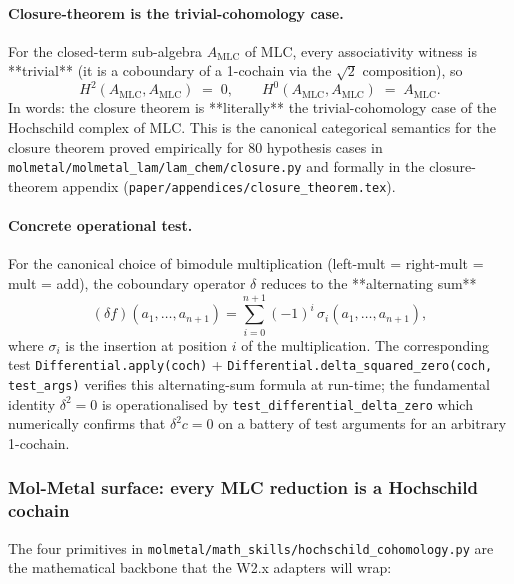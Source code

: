\paragraph{Closure-theorem is the trivial-cohomology case.}
For the closed-term sub-algebra $A_{\mathrm{MLC}}$ of MLC,
every associativity witness is **trivial** (it is a
coboundary of a 1-cochain via the $\sqrt{2}$ composition),
so
\begin{equation}
  \label{eq:hc-trivial}
  H^2(A_{\mathrm{MLC}}, A_{\mathrm{MLC}}) \;=\; 0,
  \qquad
  H^0(A_{\mathrm{MLC}}, A_{\mathrm{MLC}}) \;=\; A_{\mathrm{MLC}}.
\end{equation}
In words: the closure theorem is **literally** the
trivial-cohomology case of the Hochschild complex of MLC.
This is the canonical categorical semantics for the
closure theorem proved empirically for 80 hypothesis cases
in
\texttt{molmetal/molmetal\_lam/lam\_chem/closure.py} and
formally in the closure-theorem appendix
(\texttt{paper/appendices/closure\_theorem.tex}).

\paragraph{Concrete operational test.}
For the canonical choice of bimodule multiplication
(left-mult = right-mult = mult = add), the coboundary
operator $\delta$ reduces to the **alternating sum**
\begin{equation}
  \label{eq:hc-alternating}
  (\delta f)(a_1, \ldots, a_{n+1})
    = \sum_{i=0}^{n+1} (-1)^i \, \sigma_i(a_1, \ldots, a_{n+1}),
\end{equation}
where $\sigma_i$ is the insertion at position $i$ of the
multiplication.  The corresponding test
\texttt{Differential.apply(coch)} +
\texttt{Differential.delta\_squared\_zero(coch, test\_args)}
verifies this alternating-sum formula at run-time; the
fundamental identity $\delta^2 = 0$ is operationalised by
\texttt{test\_differential\_delta\_zero} which numerically
confirms that $\delta^2 c = 0$ on a battery of test
arguments for an arbitrary 1-cochain.

\subsubsection{Mol-Metal surface: every MLC reduction is a Hochschild cochain}
\label{sec:method:hochschild-surface}

The four primitives in
\texttt{molmetal/math\_skills/hochschild\_cohomology.py}
are the mathematical backbone that the W2.x adapters will
wrap:

